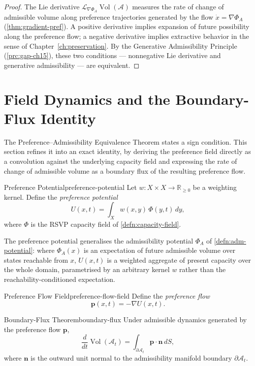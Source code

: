 \documentclass[12pt,twoside,openright]{book}
\newcommand{\adm}{\mathcal{A}}
\newcommand{\Vol}{\operatorname{Vol}}
\begin{document}
\begin{proof}
  The Lie derivative $\mathcal{L}_{\nabla\Phi_A}\Vol(\adm)$
  measures the rate of change of admissible volume along
  preference trajectories generated by the flow
  $\dot{x} = \nabla\Phi_A$ (\cref{thm:gradient-pref}). A
  positive derivative implies expansion of future
  possibility along the preference flow; a negative
  derivative implies extractive behavior in the sense of
  Chapter~\ref{ch:preservation}. By the Generative
  Admissibility Principle (\cref{prc:gap-ch15}), these two
  conditions — nonnegative Lie derivative and generative
  admissibility — are equivalent.
\end{proof}

\section{Field Dynamics and the Boundary-Flux Identity}
\label{sec:ch22-field-dynamics}

The Preference--Admissibility Equivalence Theorem states a
sign condition. This section refines it into an exact
identity, by deriving the preference field directly as a
convolution against the underlying capacity field and
expressing the rate of change of admissible volume as a
boundary flux of the resulting preference flow.

\begin{definition}{Preference Potential}{preference-potential}
  Let $w:X\times X\to\mathbb{R}_{\ge0}$ be a weighting
  kernel. Define the \emph{preference potential}
  \[
    U(x,t) = \int_X w(x,y)\,\Phi(y,t)\,dy,
  \]
  where $\Phi$ is the RSVP capacity field of
  \cref{defn:capacity-field}.
\end{definition}

The preference potential generalises the admissibility
potential $\Phi_A$ of \cref{defn:adm-potential}: where
$\Phi_A(x)$ is an expectation of future admissible volume
over states reachable from $x$, $U(x,t)$ is a weighted
aggregate of present capacity over the whole domain,
parametrised by an arbitrary kernel $w$ rather than the
reachability-conditioned expectation.

\begin{definition}{Preference Flow Field}{preference-flow-field}
  Define the \emph{preference flow}
  \[
    \mathbf{p}(x,t) = -\nabla U(x,t).
  \]
\end{definition}

\begin{theorem}{Boundary-Flux Theorem}{boundary-flux}
  Under admissible dynamics generated by the preference
  flow $\mathbf{p}$,
  \[
    \frac{d}{dt}\Vol(\mathcal{A}_t)
    = \int_{\partial\mathcal{A}_t} \mathbf{p}\cdot\mathbf{n}\,dS,
  \]
  where $\mathbf{n}$ is the outward unit normal to the
  admissibility manifold boundary $\partial\mathcal{A}_t$.
\end{theorem}
\end{document}
